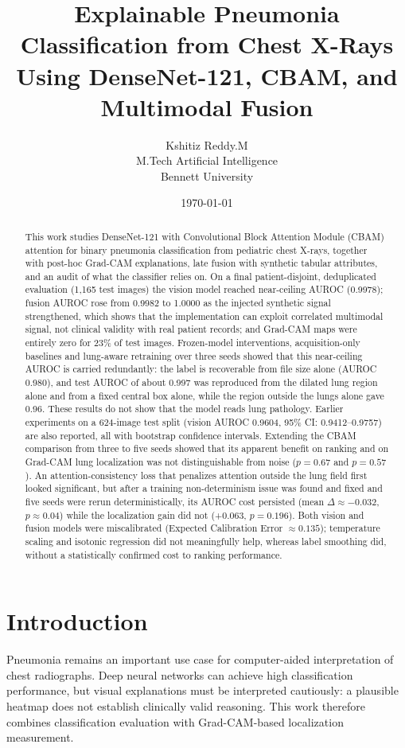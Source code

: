 \documentclass[11pt,a4paper]{article}
\title{Explainable Pneumonia Classification from Chest X-Rays Using DenseNet-121, CBAM, and Multimodal Fusion}
\author{Kshitiz Reddy.M \\ M.Tech Artificial Intelligence \\ Bennett University}
\date{\today}
\begin{document}
\maketitle

\begin{abstract}
This work studies DenseNet-121 with Convolutional Block Attention Module (CBAM) attention for binary
pneumonia classification from pediatric chest X-rays, together with post-hoc Grad-CAM explanations,
late fusion with synthetic tabular attributes, and an audit of what the classifier relies on. On a final
patient-disjoint, deduplicated evaluation (1,165 test images) the vision model reached near-ceiling AUROC
(0.9978); fusion AUROC rose from 0.9982 to 1.0000 as the injected synthetic signal strengthened, which
shows that the implementation can exploit correlated multimodal signal, not clinical validity with real
patient records; and Grad-CAM maps were entirely zero for 23\% of test images. Frozen-model interventions,
acquisition-only baselines and lung-aware retraining over three seeds showed that this near-ceiling AUROC is
carried redundantly: the label is recoverable from file size alone (AUROC 0.980), and test AUROC of about
0.997 was reproduced from the dilated lung region alone and from a fixed central box alone, while the region
outside the lungs alone gave 0.96. These results do not show that the model reads lung pathology.
Earlier experiments on a 624-image test split (vision AUROC 0.9604, 95\% CI: 0.9412--0.9757) are also
reported, all with bootstrap confidence intervals. Extending the CBAM comparison from three to five seeds
showed that its apparent benefit on ranking and on Grad-CAM lung localization was not distinguishable from
noise ($p=0.67$ and $p=0.57$). An attention-consistency loss that penalizes attention outside the lung field
first looked significant, but after a training non-determinism issue was found and fixed and five seeds were
rerun deterministically, its AUROC cost persisted (mean $\Delta\approx-0.032$, $p\approx0.04$) while the
localization gain did not (+0.063, $p=0.196$). Both vision and fusion models were miscalibrated (Expected
Calibration Error $\approx 0.135$); temperature scaling and isotonic regression did not meaningfully help,
whereas label smoothing did, without a statistically confirmed cost to ranking performance.
\end{abstract}

\section{Introduction}
Pneumonia remains an important use case for computer-aided interpretation of
chest radiographs. Deep neural networks can achieve high classification
performance, but visual explanations must be interpreted cautiously: a
plausible heatmap does not establish clinically valid reasoning. This work
therefore combines classification evaluation with Grad-CAM-based localization
measurement.
\end{document}
